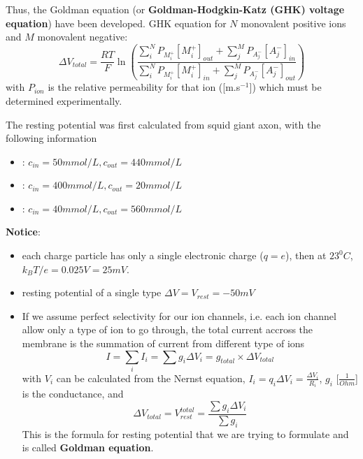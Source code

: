 Thus, the Goldman equation (or {\bf
Goldman-Hodgkin-Katz (GHK) voltage equation}) have been developed.  GHK equation for $N$ monovalent
positive ions and $M$ monovalent negative:
\begin{equation}
  \label{eq:157}
  \Delta V_{total} = \frac{RT}{F}\ln \left( \frac{
\sum_i^N P_{M_i^+}[M^+_i]_{out} + \sum_j^M P_{A_j^-}[A^-_j]_{in} 
}{
\sum_i^N P_{M_i^+}[M^+_i]_{in} + \sum_j^M P_{A_j^-}[A^-_j]_{out} 
} \right)
\end{equation}
with $P_{ion}$ is the relative permeability for that ion
([m.s$^{-1}$]) which must be determined experimentally.

The resting potential was first calculated from squid giant axon, with
the following information
\begin{itemize}
\item {}: $c_{in} = 50 mmol/L, c_{out} = 440 mmol/L$
\item {}: $c_{in} = 400 mmol/L, c_{out} = 20 mmol/L$
\item {}: $c_{in} = 40 mmol/L, c_{out} = 560 mmol/L$
\end{itemize}

{\bf Notice}:
\begin{itemize}
\item each charge particle has only a single electronic charge ($q =
  e$), then at $23^0C$, $k_BT/e = 0.025V = 25mV$.
\item resting potential of a single type $\Delta V = V_{rest} = -50mV$
\item If we assume perfect selectivity for our ion channels, i.e. each
  ion channel allow only a type of ion to go through, the total
  current accross the membrane is the summation of current from
  different type of ions
  \begin{equation}
    I = \sum_i I_i = \sum g_i \Delta V_i = g_{total} \times \Delta V_{total}
  \end{equation}
  with $V_i$ can be calculated from the Nernst equation, $I_i = q_i
  \Delta V_i = \frac{\Delta V_i}{R_i}$, $g_i$ [$\frac{1}{Ohm}$] is the
  conductance, and
  \begin{equation}
    \Delta V_{total} = V_{rest}^{total} = \frac{\sum g_i \Delta V_i}{\sum g_i}
  \end{equation}
  This is the formula for resting potential that we are trying to
  formulate and is called {\bf Goldman equation}.
\end{itemize}

